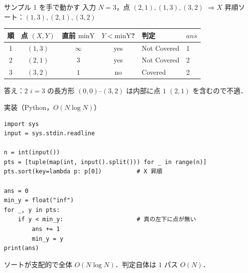 \documentclass[dvipdfmx,aspectratio=169]{beamer}
\begin{document}
\begin{frame}{サンプル 1 を手で動かす}
  入力 $N=3$，点 $(2,1),(1,3),(3,2)$\quad
  $\Rightarrow$\quad $X$ 昇順ソート：$(1,3),(2,1),(3,2)$

  \vspace{0.6em}
  \begin{center}
  \begin{tabular}{ccccll}
    \toprule
    順 & 点 $(X,Y)$ & 直前 $\mathrm{minY}$ & $Y<\mathrm{minY}$? & 判定 & $ans$\\
    \midrule
    1 & $(1,3)$ & $\infty$ & yes & \textcolor{ok}{Not Covered} & 1\\
    2 & $(2,1)$ & $3$ & yes & \textcolor{ok}{Not Covered} & 2\\
    3 & $(3,2)$ & $1$ & no  & \textcolor{ng}{Covered} & 2\\
    \bottomrule
  \end{tabular}
  \end{center}

  \vspace{0.6em}
  \begin{alertblock}{答え：2}
    $i=3$ の長方形 $(0,0)$--$(3,2)$ は内部に点 $1$ $(2,1)$ を含むので不適．
  \end{alertblock}
\end{frame}

\begin{frame}[fragile]{実装（Python，$O(N\log N)$）}
\begin{verbatim}
import sys
input = sys.stdin.readline

n = int(input())
pts = [tuple(map(int, input().split())) for _ in range(n)]
pts.sort(key=lambda p: p[0])          # X 昇順

ans = 0
min_y = float("inf")
for _, y in pts:
    if y < min_y:                     # 真の左下に点が無い
        ans += 1
        min_y = y
print(ans)
\end{verbatim}
  \vspace{-0.3em}
  ソートが支配的で全体 $O(N\log N)$．判定自体は $1$ パス $O(N)$．
\end{frame}
\end{document}
